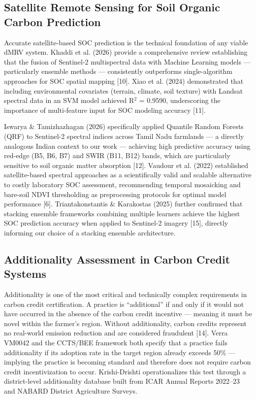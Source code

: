 \documentclass[10pt,a4paper]{article}
\begin{document}
\subsection{Satellite Remote Sensing for Soil Organic Carbon Prediction}
Accurate satellite-based SOC prediction is the technical foundation of any viable dMRV system. Khaddi et al. (2026) provide a comprehensive review establishing that the fusion of Sentinel-2 multispectral data with Machine Learning models — particularly ensemble methods — consistently outperforms single-algorithm approaches for SOC spatial mapping [10]. Xiao et al. (2024) demonstrated that including environmental covariates (terrain, climate, soil texture) with Landsat spectral data in an SVM model achieved R$^2$ = 0.9590, underscoring the importance of multi-feature input for SOC modeling accuracy [11].

Iswarya \& Tamizhazhagan (2026) specifically applied Quantile Random Forests (QRF) to Sentinel-2 spectral indices across Tamil Nadu farmlands — a directly analogous Indian context to our work — achieving high predictive accuracy using red-edge (B5, B6, B7) and SWIR (B11, B12) bands, which are particularly sensitive to soil organic matter absorption [12]. Vaudour et al. (2022) established satellite-based spectral approaches as a scientifically valid and scalable alternative to costly laboratory SOC assessment, recommending temporal mosaicking and bare-soil NDVI thresholding as preprocessing protocols for optimal model performance [6]. Triantakonstantis \& Karakostas (2025) further confirmed that stacking ensemble frameworks combining multiple learners achieve the highest SOC prediction accuracy when applied to Sentinel-2 imagery [15], directly informing our choice of a stacking ensemble architecture.

\subsection{Additionality Assessment in Carbon Credit Systems}
Additionality is one of the most critical and technically complex requirements in carbon credit certification. A practice is ``additional'' if and only if it would not have occurred in the absence of the carbon credit incentive — meaning it must be novel within the farmer's region. Without additionality, carbon credits represent no real-world emission reduction and are considered fraudulent [14]. Verra VM0042 and the CCTS/BEE framework both specify that a practice fails additionality if its adoption rate in the target region already exceeds 50\% — implying the practice is becoming standard and therefore does not require carbon credit incentivization to occur. Krishi-Drishti operationalizes this test through a district-level additionality database built from ICAR Annual Reports 2022--23 and NABARD District Agriculture Surveys.
\end{document}

